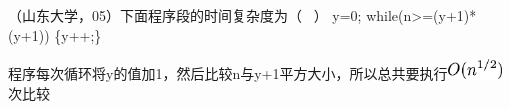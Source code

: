\question （山东大学，05）下面程序段的时间复杂度为（ ~） y=0;
while(n\textgreater{}=(y+1)*(y+1)) \{y++;\}
\par\fourch{}{}{\textcolor{red}{}}{}
\begin{solution}程序每次循环将y的值加1，然后比较n与y+1平方大小，所以总共要执行\includegraphics[width=0.57292in,height=0.20833in]{texmath/cb4bb05Cdpi7B3507DO28n5E7B12F27D29}次比较
\end{solution}

